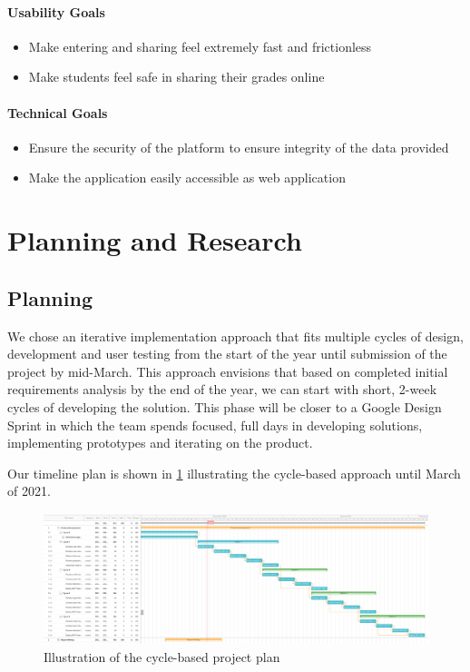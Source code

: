 \paragraph{Usability Goals}
\begin{itemize}
    \item Make entering and sharing feel extremely fast and frictionless
    \item Make students feel safe in sharing their grades online
\end{itemize}

\paragraph{Technical Goals}
\begin{itemize}
    \item Ensure the security of the platform to ensure integrity of the data provided
    \item Make the application easily accessible as web application
\end{itemize}


\section{Planning and Research}

\subsection{Planning}

We chose an iterative implementation approach that fits multiple cycles of design, development and user testing from the start of the year until submission of the project by mid-March. This approach envisions that based on completed initial requirements analysis by the end of the year, we can start with short, 2-week cycles of developing the solution. This phase will be closer to a Google Design Sprint in which the team spends focused, full days in developing solutions, implementing prototypes and iterating on the product.

Our timeline plan is shown in \cref{fig:gantt} illustrating the cycle-based approach until March of 2021.

\begin{figure}[H]
    \centering
\includegraphics[width=\textwidth]{images/gantt.png}
    \caption{Illustration of the cycle-based project plan}
    \label{fig:gantt}
\end{figure}

